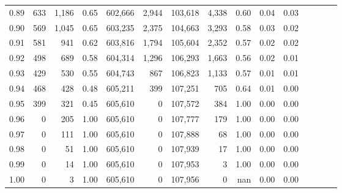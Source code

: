 \begin{tabular}{rrrcrrrrrrrrrrr}
0.89 &     633 &  1,186 &                                       0.65 &  602,666 &    2,944 &  103,618 &    4,338 &  0.60 &  0.04 &                         0.03 \\
0.90 &     569 &  1,045 &                                       0.65 &  603,235 &    2,375 &  104,663 &    3,293 &  0.58 &  0.03 &                         0.02 \\
0.91 &     581 &    941 &                                       0.62 &  603,816 &    1,794 &  105,604 &    2,352 &  0.57 &  0.02 &                         0.02 \\
0.92 &     498 &    689 &                                       0.58 &  604,314 &    1,296 &  106,293 &    1,663 &  0.56 &  0.02 &                         0.01 \\
0.93 &     429 &    530 &                                       0.55 &  604,743 &      867 &  106,823 &    1,133 &  0.57 &  0.01 &                         0.01 \\
0.94 &     468 &    428 &                                       0.48 &  605,211 &      399 &  107,251 &      705 &  0.64 &  0.01 &                         0.00 \\
0.95 &     399 &    321 &                                       0.45 &  605,610 &        0 &  107,572 &      384 &  1.00 &  0.00 &                         0.00 \\
0.96 &       0 &    205 &                                       1.00 &  605,610 &        0 &  107,777 &      179 &  1.00 &  0.00 &                         0.00 \\
0.97 &       0 &    111 &                                       1.00 &  605,610 &        0 &  107,888 &       68 &  1.00 &  0.00 &                         0.00 \\
0.98 &       0 &     51 &                                       1.00 &  605,610 &        0 &  107,939 &       17 &  1.00 &  0.00 &                         0.00 \\
0.99 &       0 &     14 &                                       1.00 &  605,610 &        0 &  107,953 &        3 &  1.00 &  0.00 &                         0.00 \\
1.00 &       0 &      3 &                                       1.00 &  605,610 &        0 &  107,956 &        0 &   nan &  0.00 &                         0.00 \\
\bottomrule
\end{tabular}
